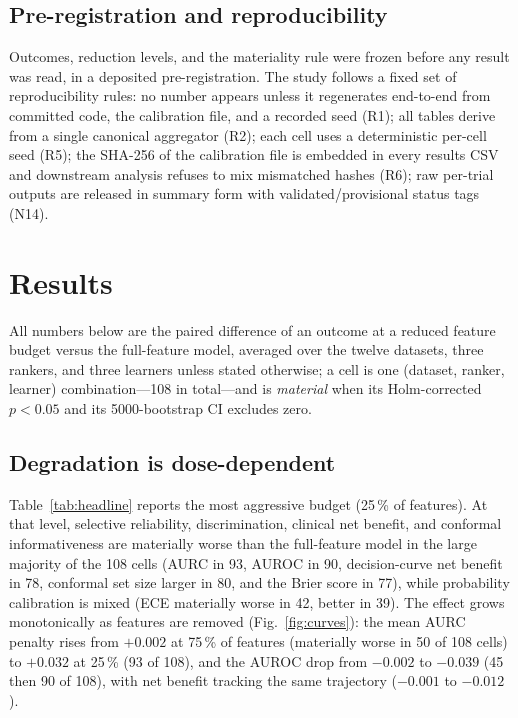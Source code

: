 \documentclass[fleqn,10pt]{wlscirep}
\newcommand{\result}[1]{#1}
\begin{document}
\subsection{Pre-registration and reproducibility}
\label{sec:prereg}
Outcomes, reduction levels, and the materiality rule were frozen before any result was read, in a deposited pre-registration. The study follows a fixed set of reproducibility rules:
no number appears unless it regenerates end-to-end from committed code, the calibration file,
and a recorded seed (R1); all tables derive from a single canonical aggregator (R2); each cell
uses a deterministic per-cell seed (R5); the SHA-256 of the calibration file is embedded in
every results CSV and downstream analysis refuses to mix mismatched hashes (R6); raw
per-trial outputs are released in summary form with validated/provisional status tags (N14).

\section{Results}
\label{sec:results}

All numbers below are the paired difference of an outcome at a reduced feature budget versus
the full-feature model, averaged over the twelve datasets, three rankers, and three learners unless
stated otherwise; a cell is one (dataset, ranker, learner) combination---\result{108} in total---and
is \emph{material} when its Holm-corrected $p<0.05$ and its 5000-bootstrap CI excludes zero.

\subsection{Degradation is dose-dependent}
Table~\ref{tab:headline} reports the most aggressive budget (25\,\% of features). At that level,
selective reliability, discrimination, clinical net benefit, and conformal informativeness are
materially worse than the full-feature model in the large majority of the \result{108} cells (AURC in
\result{93}, AUROC in \result{90}, decision-curve net benefit in \result{78}, conformal set size
larger in \result{80}, and the Brier score in \result{77}), while probability calibration is
mixed (ECE materially worse in \result{42}, better in \result{39}). The effect grows monotonically as
features are removed (Fig.~\ref{fig:curves}): the mean AURC penalty rises from \result{$+0.002$} at
75\,\% of features (materially worse in \result{50} of \result{108} cells) to \result{$+0.032$} at
25\,\% (\result{93} of \result{108}), and the AUROC drop from \result{$-0.002$} to \result{$-0.039$}
(\result{45} then \result{90} of \result{108}), with net benefit tracking the same trajectory
(\result{$-0.001$} to \result{$-0.012$}).
\end{document}
